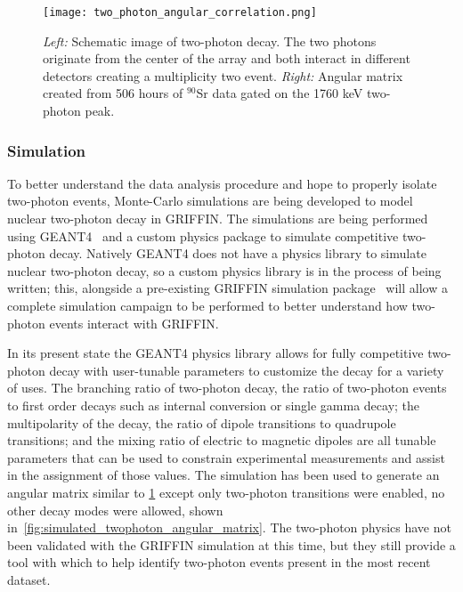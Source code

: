 \documentclass[cnatzke_thesis_proposal.tex]{subfiles}
\begin{document}
\begin{figure}[htbp]
  \centering
  \texttt{[image: two\_photon\_angular\_correlation.png]}
  \caption{
    \textit{Left:} Schematic image of two-photon decay. The two photons originate from the center of the array and both interact in different detectors creating a multiplicity two event.
    \textit{Right:} Angular matrix created from 506 hours of $^{90}$Sr data gated on the 1760 keV two-photon peak.
  }
  \label{fig:two_photon_angular_schematic}
\end{figure}

\subsubsection{Simulation}
\label{sec:simulation}
To better understand the data analysis procedure and hope to properly isolate two-photon events, Monte-Carlo simulations are being developed to model nuclear two-photon decay in GRIFFIN.
The simulations are being performed using GEANT4~\cite{allison_recent_2016} and a custom physics package to simulate competitive two-photon decay.
Natively GEANT4 does not have a physics library to simulate nuclear two-photon decay, so a custom physics library is in the process of being written; this, alongside a pre-existing GRIFFIN simulation package~\cite{v_bildstein_griffincollaborationdetectorsimulations_v10_2017} will allow a complete simulation campaign to be performed to better understand how two-photon events interact with GRIFFIN.

In its present state the GEANT4 physics library allows for fully competitive two-photon decay with user-tunable parameters to customize the decay for a variety of uses.
The branching ratio of two-photon decay, the ratio of two-photon events to first order decays such as internal conversion or single gamma decay; the multipolarity of the decay, the ratio of dipole transitions to quadrupole transitions; and the mixing ratio of electric to magnetic dipoles are all tunable parameters that can be used to constrain experimental measurements and assist in the assignment of those values.
The simulation has been used to generate an angular matrix similar to \ref{fig:two_photon_angular_schematic} except only two-photon transitions were enabled, no other decay modes were allowed, shown in~\ref{fig:simulated_twophoton_angular_matrix}.
The two-photon physics have not been validated with the GRIFFIN simulation at this time, but they still provide a tool with which to help identify two-photon events present in the most recent dataset.
\end{document}
